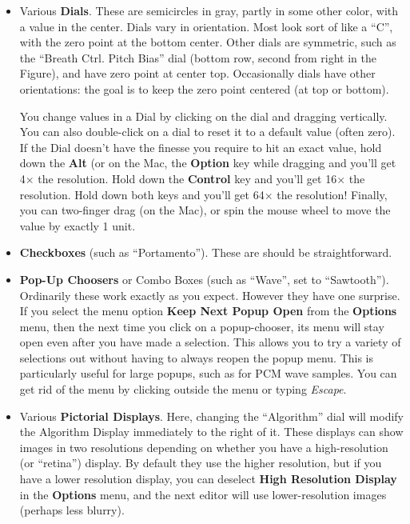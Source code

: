 \documentclass{article}
\begin{document}
\begin{itemize}
\item Various {\bf Dials}. These are semicircles in gray, partly in some other color, with a value in the center.  Dials vary in orientation.  Most look sort of like a ``C'', with the zero point at the bottom center.  Other dials are symmetric, such as the ``Breath Ctrl. Pitch Bias'' dial (bottom row, second from right in the Figure), and have zero point at center top.  Occasionally dials have other orientations: the goal is to keep the zero point centered (at top or bottom).

You change values in a Dial by clicking on the dial and dragging vertically.  You can also double-click on a dial to reset it to a default value (often zero).  If the Dial doesn't have the finesse you require to hit an exact value, hold down the {\bf Alt} (or on the Mac, the {\bf Option} key while dragging and you'll get 4\(\times\) the resolution.  Hold down the {\bf Control} key and you'll get 16\(\times\) the resolution. Hold down both keys and you'll get 64\(\times\) the resolution!  Finally, you can  two-finger drag (on the Mac), or spin the mouse wheel to move the value by exactly 1 unit.  


\item {\bf Checkboxes} (such as ``Portamento'').  These are should be straightforward.

\item {\bf Pop-Up Choosers} or Combo Boxes (such as ``Wave'', set to ``Sawtooth'').  Ordinarily these work exactly as you expect.  However they have one surprise.  If you select the menu option {\bf Keep Next Popup Open} from the {\bf Options} menu, then the next time you click on a popup-chooser, its menu will stay open even after you have made a selection.  This allows you to try a variety of selections out without having to always reopen the popup menu.  This is particularly useful for large popups, such as for PCM wave samples.  You can get rid of the menu by clicking outside the menu or typing {\it Escape}.  

\item Various {\bf Pictorial Displays}.  Here, changing the ``Algorithm'' dial will modify the Algorithm Display immediately to the right of it.  These displays can show images in two resolutions depending on whether you have a high-resolution (or ``retina'') display.  By default they use the higher resolution, but if you have a lower resolution display, you can deselect {\bf High Resolution Display} in the {\bf Options} menu, and the next editor will use lower-resolution images (perhaps less blurry).


\end{itemize}
\end{document}

